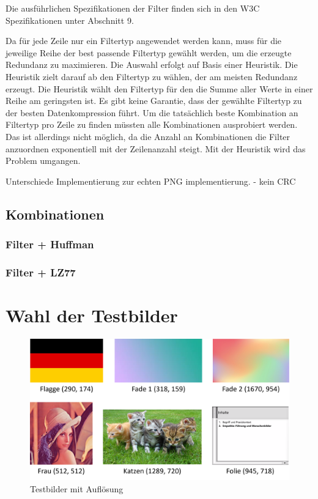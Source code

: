 \documentclass[conference]{IEEEtran}
\begin{document}
Die ausführlichen Spezifikationen der Filter finden sich in den W3C Spezifikationen \cite{w3c} unter
Abschnitt 9. 

Da für jede Zeile nur ein Filtertyp angewendet werden kann, muss für die jeweilige 
Reihe der best passende Filtertyp gewählt werden, um die erzeugte Redundanz zu maximieren.
Die Auswahl erfolgt auf Basis einer Heuristik.
Die Heuristik zielt darauf ab den Filtertyp zu wählen, der am meisten Redundanz erzeugt.
Die Heuristik wählt den Filtertyp für den die Summe aller Werte in einer Reihe 
am geringsten ist. 
Es gibt keine Garantie, dass der gewählte Filtertyp zu der besten Datenkompression 
führt. 
Um die tatsächlich beste Kombination an Filtertyp pro Zeile zu finden müssten alle 
Kombinationen ausprobiert werden. 
Das ist allerdings nicht möglich, da die Anzahl an Kombinationen die Filter 
anzuordnen exponentiell mit der Zeilenanzahl steigt.
Mit der Heuristik wird das Problem umgangen.


Unterschiede Implementierung zur echten PNG implementierung.
- kein CRC


\subsection{Kombinationen}

\subsubsection{Filter + Huffman}
\subsubsection{Filter + LZ77}


\section{Wahl der Testbilder}

\begin{figure}[h]
  \centering
  \includegraphics[width=\columnwidth]{./images/Images.png}
  \caption{Testbilder mit Auflösung}
  \label{fig:testbilder}
\end{figure}
\end{document}
